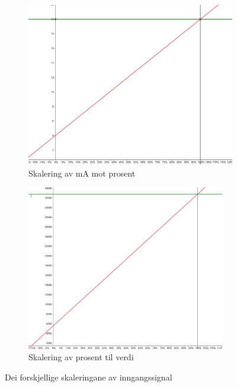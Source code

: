 
\begin{figure}[htbp]
    \centering
    \begin{subfigure}[b]{0.45\textwidth}
        \centering
        \includegraphics[width=1\textwidth]{Bilder/4_20mA_Scaling.png}
        \caption{Skalering av mA mot prosent}\label{fig:Skalering av mA mot prosent}
    \end{subfigure}
    \hfill
    \begin{subfigure}[b]{0.45\textwidth}
        \centering
        \includegraphics[width=0.95\textwidth]{Bilder/27327_prosent_Scaling.png}
        \caption{Skalering av prosent til verdi}\label{fig:Skalering av prosent til verdi}
    \end{subfigure}
    \caption{Dei forskjellige skaleringane av inngangssignal}\label{fig:Skalering av prosent til verdi}
\end{figure}